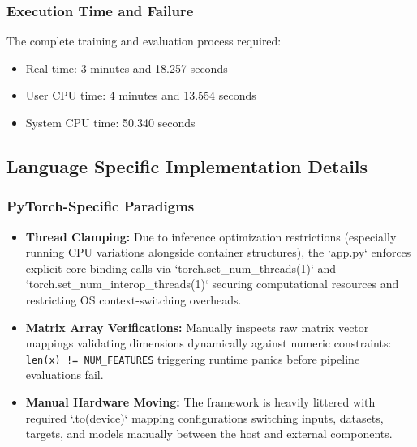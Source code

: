 \documentclass[10pt,a4paper,twocolumn]{article}
\begin{document}
\subsubsection{Execution Time and Failure}

The complete training and evaluation process required:

\begin{itemize}
    \item Real time: 3 minutes and 18.257 seconds
    \item User CPU time: 4 minutes and 13.554 seconds
    \item System CPU time: 50.340 seconds
\end{itemize}

\subsection{Language Specific Implementation Details}

\subsubsection{PyTorch-Specific Paradigms}
\begin{itemize}
    \item \textbf{Thread Clamping:} Due to inference optimization restrictions (especially running CPU variations alongside container structures), the `app.py` enforces explicit core binding calls via `torch.set\_num\_threads(1)` and `torch.set\_num\_interop\_threads(1)` securing computational resources and restricting OS context-switching overheads.
    \item \textbf{Matrix Array Verifications:} Manually inspects raw matrix vector mappings validating dimensions dynamically against numeric constraints: \texttt{len(x) != NUM\_FEATURES} triggering runtime panics before pipeline evaluations fail. 
    \item \textbf{Manual Hardware Moving:} The framework is heavily littered with required `.to(device)` mapping configurations switching inputs, datasets, targets, and models manually between the host and external components.
\end{itemize}
\end{document}
